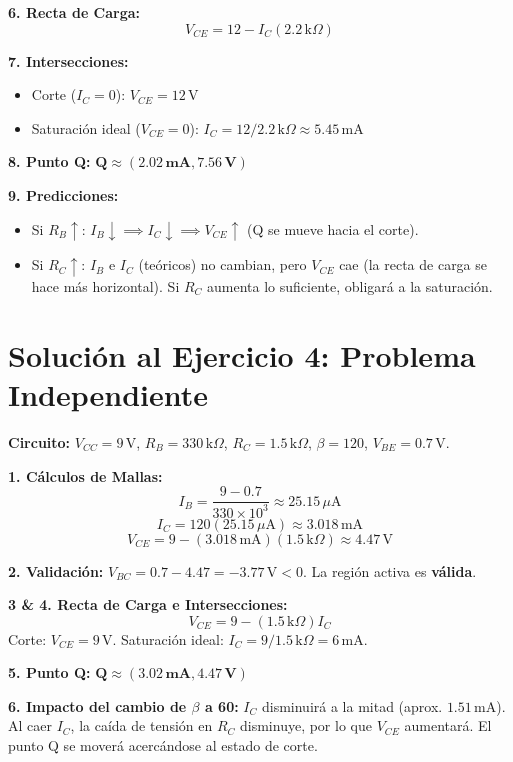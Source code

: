 \documentclass[11pt, a4paper]{article}
\begin{document}
\textbf{6. Recta de Carga:}
\begin{equation*}
    V_{CE} = 12 - I_C(2.2\,\text{k}\Omega)
\end{equation*}

\textbf{7. Intersecciones:}
\begin{itemize}
    \item Corte ($I_C = 0$): $V_{CE} = 12\,\text{V}$
    \item Saturación ideal ($V_{CE} = 0$): $I_C = 12 / 2.2\,\text{k}\Omega \approx 5.45\,\text{mA}$
\end{itemize}

\textbf{8. Punto Q:}
$\mathbf{Q \approx (2.02\,\text{mA}, 7.56\,\text{V})}$

\textbf{9. Predicciones:}
\begin{itemize}
    \item Si $R_B \uparrow$: $I_B \downarrow \implies I_C \downarrow \implies V_{CE} \uparrow$ (Q se mueve hacia el corte).
    \item Si $R_C \uparrow$: $I_B$ e $I_C$ (teóricos) no cambian, pero $V_{CE}$ cae (la recta de carga se hace más horizontal). Si $R_C$ aumenta lo suficiente, obligará a la saturación.
\end{itemize}


\section*{Solución al Ejercicio 4: Problema Independiente}
\textbf{Circuito:} $V_{CC}=9\,\text{V}$, $R_B=330\,\text{k}\Omega$, $R_C=1.5\,\text{k}\Omega$, $\beta=120$, $V_{BE}=0.7\,\text{V}$.

\textbf{1. Cálculos de Mallas:}
\begin{equation*}
    I_B = \frac{9 - 0.7}{330 \times 10^3} \approx 25.15\,\mu\text{A}
\end{equation*}
\begin{equation*}
    I_C = 120(25.15\,\mu\text{A}) \approx 3.018\,\text{mA}
\end{equation*}
\begin{equation*}
    V_{CE} = 9 - (3.018\,\text{mA})(1.5\,\text{k}\Omega) \approx 4.47\,\text{V}
\end{equation*}

\textbf{2. Validación:}
$V_{BC} = 0.7 - 4.47 = -3.77\,\text{V} < 0$. La región activa es \textbf{válida}.

\textbf{3 \& 4. Recta de Carga e Intersecciones:}
\begin{equation*}
    V_{CE} = 9 - (1.5\,\text{k}\Omega)I_C
\end{equation*}
Corte: $V_{CE} = 9\,\text{V}$. Saturación ideal: $I_C = 9 / 1.5\,\text{k}\Omega = 6\,\text{mA}$.

\textbf{5. Punto Q:}
$\mathbf{Q \approx (3.02\,\text{mA}, 4.47\,\text{V})}$

\textbf{6. Impacto del cambio de $\beta$ a 60:}
$I_C$ disminuirá a la mitad (aprox. $1.51\,\text{mA}$). Al caer $I_C$, la caída de tensión en $R_C$ disminuye, por lo que $V_{CE}$ aumentará. El punto Q se moverá acercándose al estado de corte.
\end{document}
